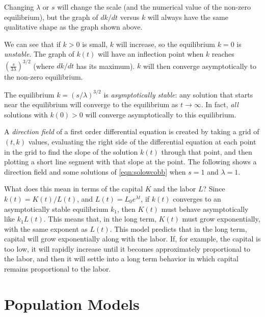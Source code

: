 \documentclass{book}
\begin{document}
\noindent
Changing $\lambda$ or $s$ will change the scale
(and the numerical value of the non-zero equilibrium),
but the graph of $dk/dt$ versus $k$ will always have the
same qualitative shape as the graph shown above.

We can see that if $k>0$ is small, $k$
will increase, so the equilibrium $k=0$ is \emph{unstable}.
The graph of $k(t)$ will have an inflection point when $k$ reaches
$\left(\frac{s}{3\lambda}\right)^{3/2}$ (where $dk/dt$ has its maximum).
$k$ will then converge asymptotically to the non-zero equilibrium.

The equilibrium $k=(s/\lambda)^{3/2}$ is \emph{asymptotically stable}:
any solution that starts near the equilibrium will converge to the equilibrium
as $t\rightarrow \infty$.
In fact, \emph{all} solutions with $k(0)>0$ will converge asymptotically to this
equilibrium.

A \emph{direction field} of a first order differential equation is created by
taking a grid of $(t,k)$ values, evaluating the right side of the differential
equation at each point in the grid to find the slope of the solution $k(t)$
through that point, and then plotting a short line segment with that slope
at the point.
The following shows a direction field and some solutions
of \eqref{eqn:solowcobb} when $s=1$ and $\lambda=1$.

\centerline{}

\vspace{0.25in}

What does this mean in terms of the capital $K$ and the labor $L$?
Since $k(t) = K(t)/L(t)$, and $L(t) = L_0e^{\lambda t}$, if $k(t)$ converges to an
asymptotically stable equilibrium $k_1$, then $K(t)$ must behave asymptotically like
$k_1  L(t)$.  This means that, in the long term, $K(t)$ must 
grow exponentially, with the
same exponent as $L(t)$.
This model predicts that in the long term, capital will grow
exponentially along with the labor.
If, for example, the capital is too low, it will rapidly increase until it becomes
approximately proportional to the labor, and then it will settle into a long term behavior in
which capital remains proportional to the labor.


\section{Population Models}
\end{document}
